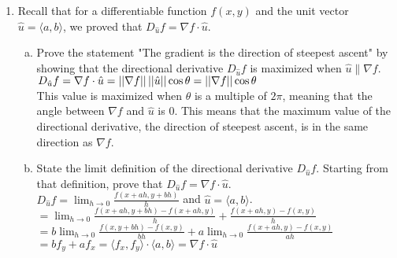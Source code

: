 \begin{enumerate}
	\item Recall that for a differentiable function $f(x,y)$ and the unit vector $\hat{u}=\langle a,b\rangle$, we proved that $D_{\hat{u}}f=\nabla f\cdot\hat{u}$.
	\begin{enumerate}[a.]
		\item Prove the statement "The gradient is the direction of steepest ascent" by showing that the directional derivative $D_{\hat{u}}f$ is maximized when $\hat{u}\parallel\nabla f$.\\
		\indent
		$D_{\hat{u}}f=\nabla f\cdot\hat{u}=\left|\left|\nabla f\right|\right|\left|\left|\hat{u}\right|\right|\cos{\theta}=\left|\left|\nabla f\right|\right|\cos{\theta}$\\
		This value is maximized when $\theta$ is a multiple of $2\pi$, meaning that the angle between $\nabla f$ and $\hat{u}$ is 0. This means that the maximum value of the directional derivative, the direction of steepest ascent, is in the same direction as $\nabla f$.\\
			
		\item State the limit definition of the directional derivative $D_{\hat{u}}f$. Starting from that definition, prove that $D_{\hat{u}}f=\nabla f\cdot\hat{u}$.\\
		$D_{\hat{u}}f=\lim_{h\to 0}{\frac{f(x+ah,y+bh)}{h}}$ and $\hat{u}=\langle a,b\rangle$.\\
		$=\lim_{h\to 0}{\frac{f(x+ah,y+bh)-f(x+ah,y)}{h}+\frac{f(x+ah,y)-f(x,y)}{h}}$\\
		$=b\lim_{h\to 0}{\frac{f(x,y+bh)-f(x,y)}{bh}}+a\lim_{h\to 0}{\frac{f(x+ah,y)-f(x,y)}{ah}}$\\
		$=bf_y+af_x=\langle f_x, f_y\rangle\cdot\langle a,b\rangle=\nabla f\cdot\hat{u}$\\
	\end{enumerate}
	

\end{enumerate}
